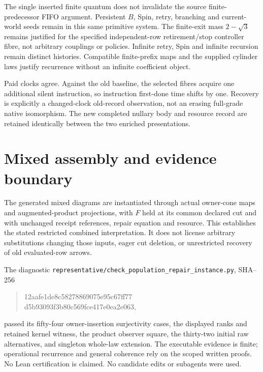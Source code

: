 \documentclass{article}
\begin{document}
The single inserted finite quantum does not invalidate the source finite-predecessor FIFO argument. Persistent $B$, Spin, retry, branching and current-world seeds remain in this same primitive system. The finite-exit mass $2-\sqrt3$ remains justified for the specified independent-row retirement/stop controller fibre, not arbitrary couplings or policies. Infinite retry, Spin and infinite recursion remain distinct histories. Compatible finite-prefix maps and the supplied cylinder laws justify recurrence without an infinite coefficient object.

Paid clocks agree. Against the old baseline, the selected fibres acquire one additional silent instruction, so instruction first-done time shifts by one. Recovery is explicitly a changed-clock old-record observation, not an erasing full-grade native isomorphism. The new completed nullary body and resource record are retained identically between the two enriched presentations.

\section*{Mixed assembly and evidence boundary}
The generated mixed diagrams are instantiated through actual owner-cone maps and augmented-product projections, with $F$ held at its common declared cut and with unchanged receipt references, repair equation and resource. This establishes the stated restricted combined interpretation. It does not license arbitrary substitutions changing those inputs, eager cut deletion, or unrestricted recovery of old evaluated-row arrows.

The diagnostic \texttt{representative/check\_population\_repair\_instance.py}, SHA--256
\begin{quote}\ttfamily\small
12aafe1de8c58278869075e95c67ff77\\d5b93093f3b80c569fce417e0ea2e063,
\end{quote}
passed its fifty-four owner-insertion surjectivity cases, the displayed ranks and retained kernel witness, the product observer square, the thirty-two initial raw alternatives, and singleton whole-law extension. The executable evidence is finite; operational recurrence and general coherence rely on the scoped written proofs. No Lean certification is claimed. No candidate edits or subagents were used.
\end{document}
